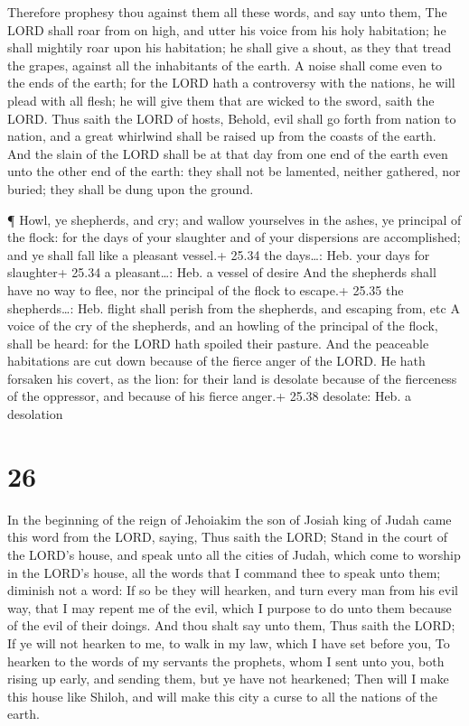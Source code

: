  Therefore prophesy thou against them all these words, and
say unto them, The LORD shall roar from on high, and utter his voice
from his holy habitation; he shall mightily roar upon his habitation; he
shall give a shout, as they that tread the grapes, against all the
inhabitants of the earth.  A noise shall come even to the
ends of the earth; for the LORD hath a controversy with the nations, he
will plead with all flesh; he will give them that are wicked to the
sword, saith the LORD.  Thus saith the LORD of hosts,
Behold, evil shall go forth from nation to nation, and a great whirlwind
shall be raised up from the coasts of the earth.  And the
slain of the LORD shall be at that day from one end of the earth even
unto the other end of the earth: they shall not be lamented, neither
gathered, nor buried; they shall be dung upon the ground.

 ¶ Howl, ye shepherds, and cry; and wallow yourselves in
the ashes, ye principal of the flock: for the days of your slaughter and
of your dispersions are accomplished; and ye shall fall like a pleasant
vessel.+ 25.34 the days\ldots: Heb. your days for slaughter+ 25.34 a
pleasant\ldots: Heb. a vessel of desire  And the shepherds
shall have no way to flee, nor the principal of the flock to escape.+
25.35 the shepherds\ldots: Heb. flight shall perish from the shepherds,
and escaping from, etc  A voice of the cry of the
shepherds, and an howling of the principal of the flock, shall be heard:
for the LORD hath spoiled their pasture.  And the peaceable
habitations are cut down because of the fierce anger of the LORD.
 He hath forsaken his covert, as the lion: for their land
is desolate because of the fierceness of the oppressor, and because of
his fierce anger.+ 25.38 desolate: Heb. a desolation

\hypertarget{section-25}{%
\section{26}\label{section-25}}

 In the beginning of the reign of Jehoiakim the son of
Josiah king of Judah came this word from the LORD, saying, 
Thus saith the LORD; Stand in the court of the LORD's house, and speak
unto all the cities of Judah, which come to worship in the LORD's house,
all the words that I command thee to speak unto them; diminish not a
word:  If so be they will hearken, and turn every man from
his evil way, that I may repent me of the evil, which I purpose to do
unto them because of the evil of their doings.  And thou
shalt say unto them, Thus saith the LORD; If ye will not hearken to me,
to walk in my law, which I have set before you,  To hearken
to the words of my servants the prophets, whom I sent unto you, both
rising up early, and sending them, but ye have not hearkened;
 Then will I make this house like Shiloh, and will make this
city a curse to all the nations of the earth.

